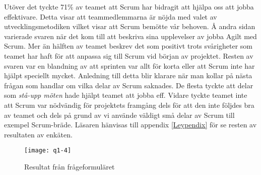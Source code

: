 Utöver det tyckte 71\% av teamet att Scrum har bidragit att hjälpa oss att jobba effektivare. Detta visar att teammedlemmarna är nöjda med valet av utvecklingsmetodiken vilket visar att Scrum bemötte vår behoven. Å andra sidan varierade svaren när det kom till att beskriva sina upplevelser av jobba Agilt med Scrum. Mer än hälften av teamet beskrev det som positivt trots svårigheter som teamet har haft för att anpassa sig till Scrum vid början av projektet. Resten av svaren var en blandning av att sprinten var allt för korta eller att Scrum inte har hjälpt speciellt mycket. Anledning till detta blir klarare när man kollar på nästa frågan som handlar om vilka delar av Scrum saknades. De flesta tyckte att delar som \textit{stå-upp möten} hade  hjälpt teamet att jobba eff. Vidare tyckte teamet inte att Scrum var nödvändig för projektets framgång dels för att den inte följdes bra av teamet och dels på grund av vi använde väldigt små delar av Scrum till exempel Scrum-bräde.
Läsaren hänvisas till appendix \ref{Leypendix} för se resten av resultaten av enkäten.
\begin{figure*}[h]
	\centering
	\texttt{[image: q1-4]}
	\caption{Resultat från frågeformuläret}
	\label{q1}
\end{figure*}